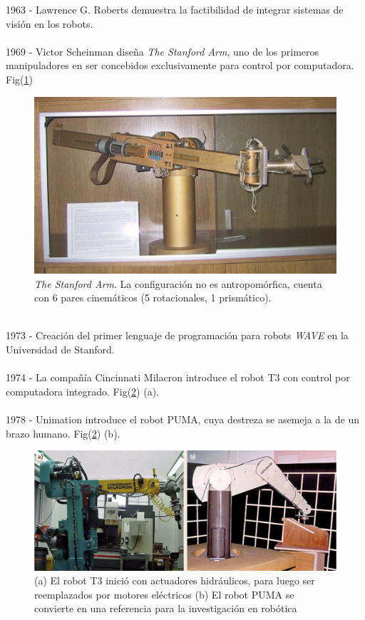 1963 - Lawrence G. Roberts demuestra la factibilidad de integrar sistemas de visión en los robots.\\\\
1969 - Victor Scheinman diseña \textit{The Stanford Arm}, uno de los primeros manipuladores en ser concebidos exclusivamente para control por computadora. Fig(\ref{stfarm})\\
\begin{figure}[h!]
	\centering
	\includegraphics[scale=0.3]{Capitulo1/figs/StanfordArm.jpg} 
	\caption{\textit{The Stanford Arm}. La configuración no es antropomórfica, cuenta con 6 pares cinemáticos (5 rotacionales, 1 prismático).}
	\label{stfarm}
\end{figure}\\
1973 - Creación del primer lenguaje de programación para robots \textit{WAVE} en la Universidad de Stanford.\\\\
1974 - La compañía Cincinnati Milacron introduce el robot T3 con control por computadora integrado. Fig(\ref{puma}) (a).\\\\
1978 - Unimation introduce el robot PUMA, cuya destreza se asemeja a la de un brazo humano. Fig(\ref{puma}) (b).\\
\begin{figure}
	\centering
	\includegraphics[scale=0.4]{Capitulo1/figs/puma.PNG} 
	\caption{(a) El robot T3 inició con actuadores hidráulicos, para luego ser reemplazados por motores eléctricos (b) El robot PUMA se convierte en una referencia para la investigación en robótica}
	\label{puma}
\end{figure}\\
